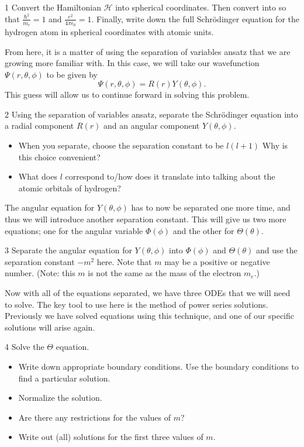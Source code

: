 \documentclass{article}
\newcommand{\hamiltonian}{\mathcal{H}}
\begin{document}
\begin{problem}{}{1}
Convert the Hamiltonian $\hamiltonian$ into spherical coordinates.  Then convert into  so that $\frac{\hbar^2}{m_e}=1$ and $\frac{e^2}{4\pi \epsilon_0}=1$.  Finally, write down the full Schr\"odinger equation for the hydrogen atom in spherical coordinates with atomic units.
\end{problem}
\noindent From here, it is a matter of using the separation of variables ansatz that we are growing more familiar with.  In this case, we will take our wavefunction $\Psi(r,\theta,\phi)$ to be given by
\[
\Psi(r,\theta,\phi) = R(r) Y(\theta,\phi).
\]
This guess will allow us to continue forward in solving this problem.
\begin{problem}{}{2}
Using the separation of variables ansatz, separate the Schr\"odinger equation into a radial component $R(r)$ and an angular component $Y(\theta,\phi)$.
\begin{itemize}
    \item When you separate, choose the separation constant to be $l(l+1)$ Why is this choice convenient?
    \item What does $l$ correspond to/how does it translate into talking about the atomic orbitals of hydrogen?
\end{itemize}
\end{problem}
\noindent The angular equation for $Y(\theta,\phi)$ has to now be separated one more time, and thus we will introduce another separation constant.  This will give us two more equations; one for the angular variable $\Phi(\phi)$ and the other for $\Theta(\theta)$.

\begin{problem}{}{3}
Separate the angular equation for $Y(\theta,\phi)$ into $\Phi(\phi)$ and $\Theta(\theta)$ and use the separation constant $-m^2$ here.  Note that $m$ may be a positive or negative number.  (Note: this $m$ is not the same as the mass of the electron $m_e$.)
\end{problem}

\noindent Now with all of the equations separated, we have three ODEs that we will need to solve. The key tool to use here is the method of power series solutions.  Previously we have solved equations using this technique, and one of our specific solutions will arise again.

\begin{problem}{}{4}
Solve the $\Theta$ equation.
\begin{itemize}
    \item Write down appropriate boundary conditions. Use the boundary conditions to find a particular solution.
    \item Normalize the solution.
    \item Are there any restrictions for the values of $m$?
    \item Write out (all) solutions for the first three values of $m$.
\end{itemize}
\end{problem}
\end{document}

